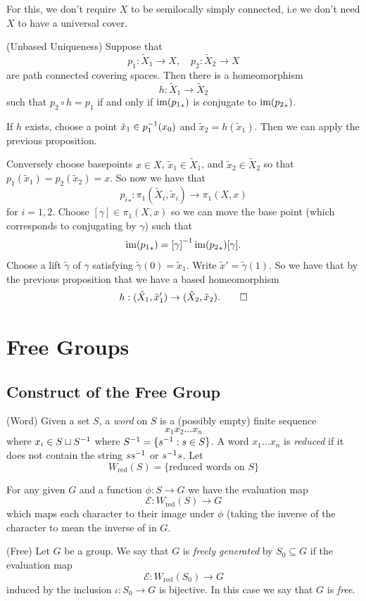 \documentclass{article}
\begin{document}
\begin{remark}
  For this, we don't require $ X $ to be semilocally simply connected, i.e we don't need $ X $ to have a universal cover.
\end{remark}
\begin{proposition}
	(Unbased Uniqueness) Suppose that
	\[
	  p_1: \tilde X_1 \to X,\quad p_2:\tilde X_2 \to X
	\]
	are path connected covering spaces. Then there is a homeomorphism
	\[
	  h: \tilde X_1 \to \tilde X_2
	\]
such that $ p_2 \circ h = p_1 $ if and only if $ \operatorname{im}({p_1}_*) $ is conjugate to $ \operatorname{im}({p_2}_*) $.
\end{proposition}
\pf If $ h $ exists, choose a point $ \tilde x_1 \in {p}^{-1}_1(x_0) $ and $ \tilde x_2 = h(\tilde x_1) $. Then we can apply the previous proposition.\par
Conversely choose basepoints $ x\in X $, $ \tilde x_1 \in \tilde X_1 $, and $ \tilde x_2 \in \tilde X_2 $ so that $ p_1(\tilde x_1) = p_2(\tilde x_2) = x $. So now we have that
\[
	{p_i}_*: \pi_1(\tilde X_i, \tilde x_i) \to \pi_1(X,x)
\]
for $ i=1,2 $. Choose $ [\gamma] \in \pi_1(X,x) $ so we can move the base point (which corresponds to conjugating by $ \gamma $) such that 
\[
	\operatorname{im}({p_1}_*) = {[\gamma]}^{-1} \operatorname{im}({p_2}_*) [\gamma].
\]
Choose a lift $ \tilde \gamma $ of $ \gamma $ satisfying $ \tilde \gamma(0) = \tilde x_1 $. Write $ \tilde x'=\tilde \gamma(1) $. So we have that by the previous proposition that we have a based homeomorphism
\[
  h: (\tilde X_1, \tilde x_1') \to (\tilde X_2, \tilde x_2).\qed
\]
\section{Free Groups}
\subsection{Construct of the Free Group}
\begin{definition}
	(Word) Given a set $ S $, a \textit{word} on $ S $ is a (possibly empty) finite sequence 
	\[
	  x_1x_2\dots x_n
	\]
	where $ x_i\in S\sqcup {S}^{-1} $ where $ {S}^{-1} = \{ {s}^{-1}: s\in S\} $. A word $ x_1\dots x_n $ is \textit{reduced} if it does not contain the string $ s{s}^{-1} $ or $ {s}^{-1} s $. Let
	\[
		W_{\mathrm{red}}(S) = \{ \text{reduced words on } S\}
	\]
\end{definition}
For any given $ G $ and a function $ \phi: S \to G $ we have the evaluation map
\[
	\mathcal E: W_{\mathrm{red}}(S) \to G
\]
which maps each character to their image under $ \phi $ (taking the inverse of the character to mean the inverse of in $ G $.
\begin{definition}
	(Free) Let $ G $ be a group. We say that $ G $ is \textit{freely generated} by $ S_0\subseteq G $ if the evaluation map
	\[
		\mathcal E: W_{\mathrm{red}}(S_0) \to G
	\]
	induced by the inclusion $ \iota: S_0 \to G $ is bijective. In this case we say that $ G $ is \textit{free}.
\end{definition}
\end{document}
